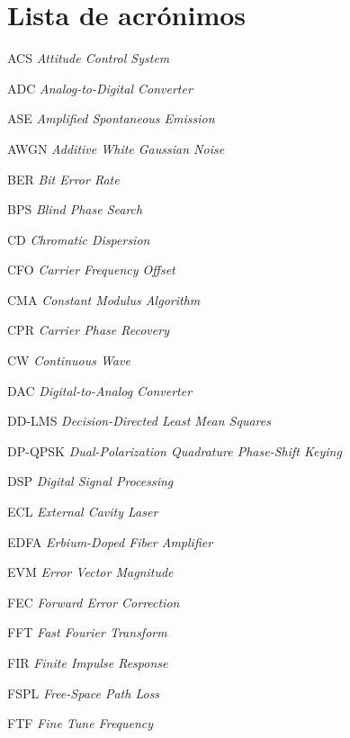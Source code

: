 
\chapter*{Lista de acr\'onimos}

\begin{listaacronimos}
\item[ACS]     \textit{Attitude Control System}
\item[ADC]     \textit{Analog-to-Digital Converter}
\item[ASE]     \textit{Amplified Spontaneous Emission}
\item[AWGN]    \textit{Additive White Gaussian Noise}
\item[BER]     \textit{Bit Error Rate}
\item[BPS]     \textit{Blind Phase Search}
\item[CD]      \textit{Chromatic Dispersion}
\item[CFO]     \textit{Carrier Frequency Offset}
\item[CMA]     \textit{Constant Modulus Algorithm}
\item[CPR]     \textit{Carrier Phase Recovery}
\item[CW]      \textit{Continuous Wave}
\item[DAC]     \textit{Digital-to-Analog Converter}
\item[DD-LMS]  \textit{Decision-Directed Least Mean Squares}
\item[DP-QPSK] \textit{Dual-Polarization Quadrature Phase-Shift Keying}
\item[DSP]     \textit{Digital Signal Processing}
\item[ECL]     \textit{External Cavity Laser}
\item[EDFA]    \textit{Erbium-Doped Fiber Amplifier}
\item[EVM]     \textit{Error Vector Magnitude}
\item[FEC]     \textit{Forward Error Correction}
\item[FFT]     \textit{Fast Fourier Transform}
\item[FIR]     \textit{Finite Impulse Response}
\item[FSPL]    \textit{Free-Space Path Loss}
\item[FTF]     \textit{Fine Tune Frequency}

\end{listaacronimos}
